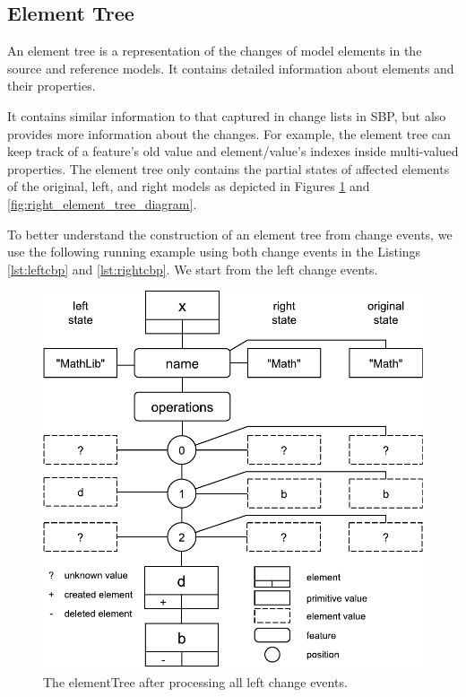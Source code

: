 \subsection{Element Tree}
\label{sec:tree_construction}
An element tree is a representation of the changes of model elements in the source and reference models.
It contains detailed information about elements and their properties.

It contains similar information to that captured in change lists in SBP, but also provides more information about the changes.
For example, the element tree can keep track of a feature's old value and element/value's indexes inside multi-valued properties. 
The element tree only contains the partial states of affected elements of the original, left, and right models as depicted in Figures \ref{fig:left_element_tree_diagram} and \ref{fig:right_element_tree_diagram}.

To better understand the construction of an element tree from change events, we use the following running example using both change events in the Listings \ref{lst:leftcbp} and \ref{lst:rightcbp}. We start from the left change events. 

\begin{figure}
    \includegraphics[width=\linewidth]{LeftElementTreeDiagram}
    \caption{The \textsf{elementTree} after processing all left change events.}
    \label{fig:left_element_tree_diagram}
\end{figure}

